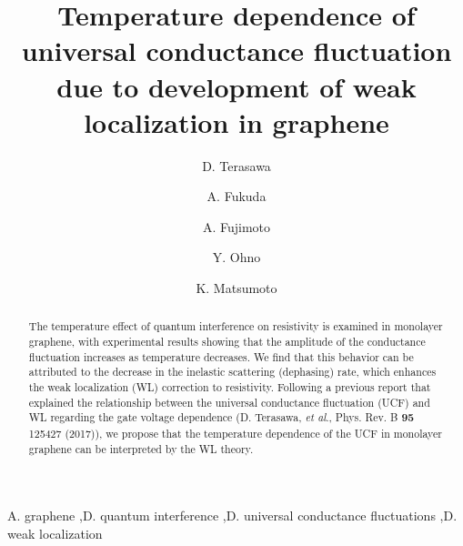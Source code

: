 \documentclass[final,5p,times,twocolumn]{elsarticle}
\begin{document}
\begin{frontmatter}

\title{Temperature dependence of universal conductance fluctuation due to development of weak localization in graphene}


\author[HCM]{D. Terasawa}

\author[HCM]{A. Fukuda}

\author[OIT]{A. Fujimoto}


\author[UTokushima]{Y. Ohno}

\author[ISIR]{K. Matsumoto}
\address[HCM]{Department of physics, Hyogo College of Medicine, Nishinomiya 663-8501, Japan}
\address[OIT]{Applied Physics, Faculty of Engineering, Osaka Institute of Technology, Osaka 535-8585, Japan}
\address[UTokushima]{Graduate School of Science and Technology, Tokushima University,  Tokushima 770-8501, Japan}
\address[ISIR]{The Institute of Scientific and Industrial Research, Osaka University, Ibaraki 567-0047, Japan}

\begin{abstract}
The temperature effect of quantum interference on resistivity is examined in monolayer graphene, 
with experimental results showing that the amplitude of the conductance fluctuation increases as temperature decreases. 
We find that this behavior can be attributed to the decrease in the inelastic scattering (dephasing) rate, which enhances the weak localization (WL) correction to resistivity.
Following a previous report that explained the relationship between the universal conductance fluctuation (UCF) and WL regarding the gate voltage dependence (D. Terasawa, {\it et al}., Phys. Rev. B {\bf 95} 125427 (2017)),  we propose that the temperature dependence of the UCF in monolayer graphene can be interpreted by the WL theory.
 \end{abstract}


\begin{keyword}
A. graphene \sep D. quantum interference \sep D. universal conductance fluctuations \sep D. weak localization


\end{keyword}


\end{frontmatter}
\end{document}
